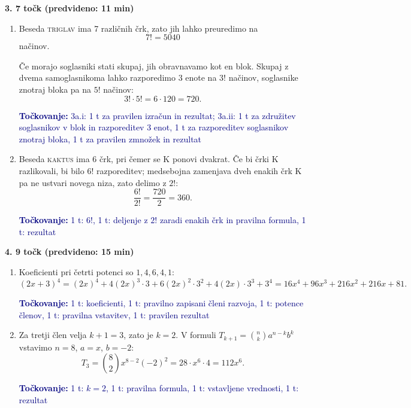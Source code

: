\documentclass[11pt,a4paper]{article}
\newenvironment{taskbox}[1]{%
    \par\addvspace{24pt}%
    \noindent\textbf{\large #1}\par
}{\par\addvspace{16pt}}
\newcommand{\rubric}[1]{%
    \par\smallskip\noindent
    {\small\textcolor{navy}{\textbf{Točkovanje:} #1}}%
    \par\smallskip}
\begin{document}
\begin{taskbox}{3. \hfill 7 točk \quad (predvideno: 11 min)}
\begin{enumerate}[label=\alph*)]
    \item Beseda \textsc{triglav} ima 7 različnih črk, zato jih lahko
    preuredimo na
    \[
        7!=\boxed{5040}
    \]
    načinov.

    Če morajo soglasniki stati skupaj, jih obravnavamo kot en blok. Skupaj
    z dvema samoglasnikoma lahko razporedimo 3 enote na \(3!\) načinov,
    soglasnike znotraj bloka pa na \(5!\) načinov:
    \[
        3!\cdot5!=6\cdot120=\boxed{720}.
    \]
    \rubric{3a.i: 1 t za pravilen izračun in rezultat; 3a.ii: 1 t za združitev
    soglasnikov v blok in razporeditev 3 enot, 1 t za razporeditev
    soglasnikov znotraj bloka, 1 t za pravilen zmnožek in rezultat}
    \item Beseda \textsc{kaktus} ima 6 črk, pri čemer se K ponovi dvakrat.
    Če bi črki K razlikovali, bi bilo \(6!\) razporeditev; medsebojna
    zamenjava dveh enakih črk K pa ne ustvari novega niza, zato delimo z \(2!\):
    \[
        \frac{6!}{2!}=\frac{720}{2}=\boxed{360}.
    \]
    \rubric{1 t: \(6!\), 1 t: deljenje z \(2!\) zaradi enakih črk in pravilna
    formula, 1 t: rezultat}
\end{enumerate}
\end{taskbox}

\begin{taskbox}{4. \hfill 9 točk \quad (predvideno: 15 min)}
\begin{enumerate}[label=\alph*)]
    \item Koeficienti pri četrti potenci so \(1,4,6,4,1\):
    \[
        (2x+3)^4
        =(2x)^4+4(2x)^3\cdot3+6(2x)^2\cdot3^2
        +4(2x)\cdot3^3+3^4
        =\boxed{16x^4+96x^3+216x^2+216x+81}.
    \]
    \rubric{1 t: koeficienti, 1 t: pravilno zapisani členi razvoja, 1 t: potence
    členov, 1 t: pravilna vstavitev, 1 t: pravilen rezultat}
    \item Za tretji člen velja \(k+1=3\), zato je \(k=2\). V formuli
    \(T_{k+1}=\binom{n}{k}a^{n-k}b^k\) vstavimo \(n=8\), \(a=x\),
    \(b=-2\):
    \[
        T_3=\binom{8}{2}x^{8-2}(-2)^2
        =28\cdot x^6\cdot4
        =\boxed{112x^6}.
    \]
    \rubric{1 t: \(k=2\), 1 t: pravilna formula, 1 t: vstavljene vrednosti,
    1 t: rezultat}
\end{enumerate}
\end{taskbox}
\end{document}
